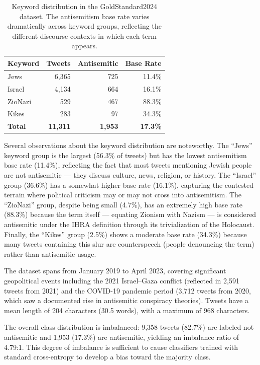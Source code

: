\documentclass[10pt,a4paper]{article}
\newcommand{\dataset}{GoldStandard2024}
\begin{document}
\begin{table}[h]
\centering
\caption{Keyword distribution in the \dataset{} dataset. The antisemitism base rate varies dramatically across keyword groups, reflecting the different discourse contexts in which each term appears.}
\label{tab:keyword_dist}
\begin{tabular}{lrrr}
\toprule
\textbf{Keyword} & \textbf{Tweets} & \textbf{Antisemitic} & \textbf{Base Rate} \\
\midrule
Jews    & 6,365 & 725  & 11.4\% \\
Israel  & 4,134 & 664  & 16.1\% \\
ZioNazi &   529 & 467  & 88.3\% \\
Kikes   &   283 &  97  & 34.3\% \\
\midrule
\textbf{Total} & \textbf{11,311} & \textbf{1,953} & \textbf{17.3\%} \\
\bottomrule
\end{tabular}
\end{table}

Several observations about the keyword distribution are noteworthy. The ``Jews'' keyword group is the largest (56.3\% of tweets) but has the lowest antisemitism base rate (11.4\%), reflecting the fact that most tweets mentioning Jewish people are not antisemitic --- they discuss culture, news, religion, or history. The ``Israel'' group (36.6\%) has a somewhat higher base rate (16.1\%), capturing the contested terrain where political criticism may or may not cross into antisemitism. The ``ZioNazi'' group, despite being small (4.7\%), has an extremely high base rate (88.3\%) because the term itself --- equating Zionism with Nazism --- is considered antisemitic under the IHRA definition through its trivialization of the Holocaust. Finally, the ``Kikes'' group (2.5\%) shows a moderate base rate (34.3\%) because many tweets containing this slur are counterspeech (people denouncing the term) rather than antisemitic usage.

The dataset spans from January 2019 to April 2023, covering significant geopolitical events including the 2021 Israel--Gaza conflict (reflected in 2,591 tweets from 2021) and the COVID-19 pandemic period (3,712 tweets from 2020, which saw a documented rise in antisemitic conspiracy theories). Tweets have a mean length of 204 characters (30.5 words), with a maximum of 968 characters.

The overall class distribution is imbalanced: 9,358 tweets (82.7\%) are labeled not antisemitic and 1,953 (17.3\%) are antisemitic, yielding an imbalance ratio of 4.79:1. This degree of imbalance is sufficient to cause classifiers trained with standard cross-entropy to develop a bias toward the majority class.
\end{document}

